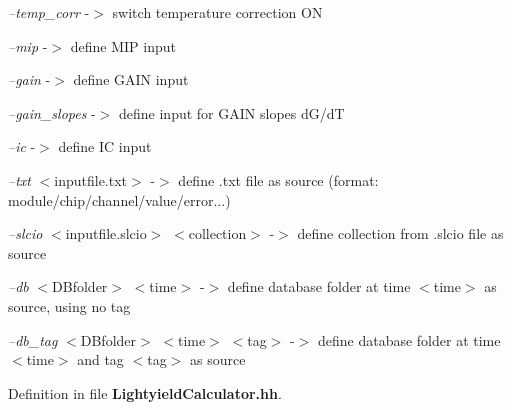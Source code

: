 {\itshape --temp\-\_\-corr} -\/$>$ switch temperature correction O\-N\par
\par
 {\itshape --mip} -\/$>$ define M\-I\-P input\par
 {\itshape --gain} -\/$>$ define G\-A\-I\-N input\par
 {\itshape --gain\-\_\-slopes} -\/$>$ define input for G\-A\-I\-N slopes d\-G/d\-T\par
 {\itshape --ic} -\/$>$ define I\-C input\par
\par
 {\itshape --txt} $<$inputfile.\-txt$>$ -\/$>$ define .txt file as source (format\-: module/chip/channel/value/error...)\par
 {\itshape --slcio} $<$inputfile.\-slcio$>$ $<$collection$>$ -\/$>$ define collection from .slcio file as source\par
 {\itshape --db} $<$D\-Bfolder$>$ $<$time$>$ -\/$>$ define database folder at time $<$time$>$ as source, using no tag\par
 {\itshape --db\-\_\-tag} $<$D\-Bfolder$>$ $<$time$>$ $<$tag$>$ -\/$>$ define database folder at time $<$time$>$ and tag $<$tag$>$ as source\par


Definition in file {\bf Lightyield\-Calculator.\-hh}.

